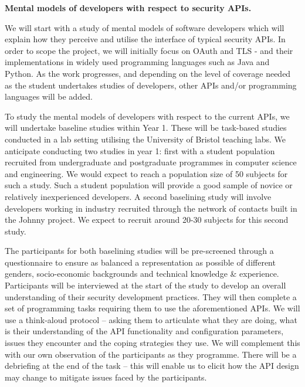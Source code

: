 \documentclass[10pt]{article}
\begin{document}
\begin{description}\itemsep-3pt
\item[WP 1] \textbf{Mental models of developers with respect to security APIs.}

We will start with a study of mental models of software developers which will explain how they perceive and utilise the interface of typical security APIs. In order to scope the project, we will initially focus on OAuth and TLS - and their implementations in widely used programming languages such as Java and Python. As the work progresses, and depending on the level of coverage needed as the student undertakes studies of developers, other APIs and/or programming languages will be added.

To study the mental models of developers with respect to the current APIs, we will undertake baseline studies within Year 1. These will be task-based studies conducted in a lab setting utilising the University of Bristol teaching labs. We anticipate conducting two studies in year 1: first with a student population recruited from undergraduate and postgraduate programmes in computer science and engineering. We would expect to reach a population size of 50 subjects for such a study. Such a student population will provide a good sample of novice or relatively inexperienced developers. A second baselining study will involve developers working in industry recruited through the network of contacts built in the Johnny project. We expect to recruit around 20-30 subjects for this second study.

The participants for both baselining studies will be pre-screened through a questionnaire to ensure as balanced a representation as possible of different genders, socio-economic backgrounds and technical knowledge \& experience. Participants will be interviewed at the start of the study to develop an overall understanding of their security development practices. They will then complete a set of programming tasks requiring them to use the aforementioned APIs. We will use a think-aloud protocol -- asking them to articulate what they are doing, what is their understanding of the API functionality and configuration parameters, issues they encounter and the coping strategies they use. We will complement this with our own observation of the participants as they programme. There will be a debriefing at the end of the task -- this will enable us to elicit how the API design may change to mitigate issues faced by the participants.


\end{description}
\end{document}
